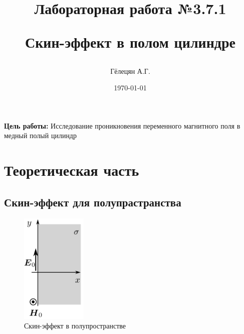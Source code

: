 \documentclass{article}
\title{\begin{center}Лабораторная работа №3.7.1\end{center}
Скин-эффект в полом цилиндре}
\author{Гёлецян А.Г.}
\date{\today}
\begin{document}
\maketitle
\newpage
{}

\textbf{Цель работы:} Исследование проникновения переменного магнитного поля в медный полый цилиндр

\section{Теоретическая часть}
\subsection{Скин-эффект для полупрастранства}
\vspace{1cm}
\begin{figure}
  \begin{center}
    \includegraphics[width=0.28\textwidth]{poluprostranstvo}
  \end{center}
  \caption{Скин-эффект в полупространстве}\label{fig:poluprostranstvo}
\end{figure}
\end{document}
